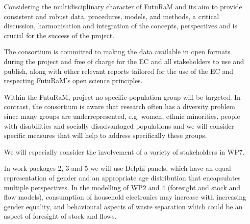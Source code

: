 
Considering the multidisciplinary character of FutuRaM and its aim to provide consistent and robust data, procedures,
models, and methods, a critical discussion, harmonisation and integration of the concepts, perspectives and is crucial
for the success of the project. 


The consortium is committed to making the data available in open formats during the project and free of charge for
the EC and all stakeholders to use and publish, along with other relevant reports tailored for the use of the EC and
respecting FutuRaM’s open science principles. 


Within the FutuRaM, project no specific population group will be targeted. In contrast, the consortium is aware that
research often has a diversity problem since many groups are underrepresented, e.g. women, ethnic minorities, people
with disabilities and socially disadvantaged populations and we will consider specific measures that will help to
address specifically these groups. 

We will especially consider the involvement of a variety of stakeholders in WP7. 

In work packages 2, 3 and 5 we will use Delphi panels, which have an equal representation of gender and an appropriate age distribution that encapsulates multiple perspectives. In the modelling of WP2 and 4 (foresight and stock and flow models), consumption of household electronics may increase with increasing gender equality, and behavioural aspects of waste separation which could be an aspect of foresight of stock and flows. 

